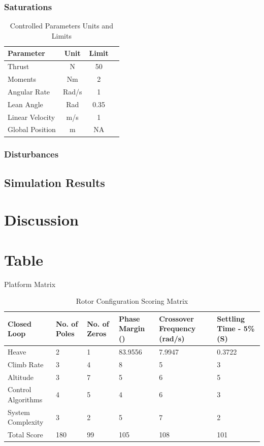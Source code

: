 	\subsubsection{Saturations}
	
	\begin{table}[!]
		\centering
		\begin{tabular}{l | c | c | c |}
			Parameter & Unit & Limit\\
			\hline\hline
			Thrust					& N 	& 50\\
			Moments					& Nm 	& 2\\
			Angular Rate 	   		& Rad/s & 1\\
			Lean Angle	    		& Rad 	& 0.35\\ %
			Linear Velocity 	  	& m/s 	& 1\\
			Global Position  		& m 	& NA\\
		\end{tabular}
		\label{tab:UnitsLimits}
		\caption{Controlled Parameters Units and Limits}
	\end{table}
	
	\subsubsection{Disturbances}
	
	
	\subsection{Simulation Results}
		
		\section{Discussion}
		
		\section{Table}
		Platform Matrix
		\begin{table}[!]
			\centering
			\begin{tabular}{l | l | l | l | p{2cm} | p{2cm} |}
				Closed Loop & No. of Poles & No. of Zeros & Phase Margin (\textdegree) & Crossover Frequency (rad/s) & Settling Time - 5\% (S)\\
				\hline\hline
				Heave 	   				& 2 & 1 & 83.9556 & 7.9947 & 0.3722\\
				Climb Rate 			    & 3 & 4 & 8 & 5 & 3\\
				Altitude		 	  	& 3 & 7 & 5 & 6 & 5\\
				Control Algorithms  	& 4 & 5 & 4 & 6 & 3\\
				System Complexity 		& 3 & 2 & 5 & 7 & 2\\
				\hline\hline
				Total Score 			& 180 & 99 & 105 & 108 & 101\\
			\end{tabular}
			\label{tab:PlatformDesign}
			\caption{Rotor Configuration Scoring Matrix}
		\end{table}
		